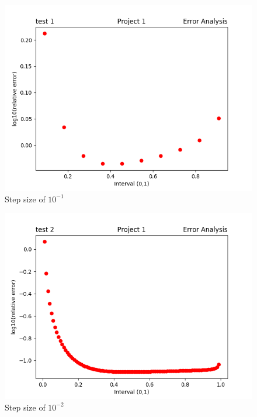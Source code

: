 \documentclass[11pt, oneside]{article}   	%
\begin{document}
\begin{figure}[H]
  \includegraphics[width=\linewidth]{test_1.png}
  \caption{Step size of $10^{-1}$}
  \label{fig:Relative Error}
\end{figure}

\begin{figure}[H]
  \includegraphics[width=\linewidth]{test_2.png}
  \caption{Step size of $10^{-2}$}
  \label{fig:boat1}
\end{figure}
\end{document}
